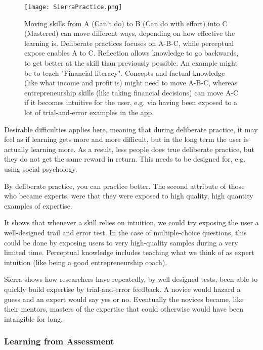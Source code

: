   \begin{figure}[h]
    \centering
    \texttt{[image: SierraPractice.png]}
    \caption{Moving skills from A (Can't do) to B (Can do with effort) into C (Mastered) can move different ways, depending on how effective the learning is. Deliberate practices focuses on A-B-C, while perceptual expose enables A to C. Reflection allows knowledge to go backwards, to get better at the skill than previously possible. An example might be to teach "Financial literacy". Concepts and factual knowledge (like what income and profit is) might need to move A-B-C, whereas entrepreneurship skills (like taking financial decisions) can move A-C if it becomes intuitive for the user, e.g. via having been exposed to a lot of trial-and-error examples in the app.}
    \label{fig:sierra-practice}
  \end{figure}

  Desirable difficulties applies here, meaning that during deliberate practice, it may feel as if learning gets more and more difficult, but in the long term the user is actually learning more. As a result, less people does true deliberate practice, but they do not get the same reward in return. This needs to be designed for, e.g. using social psychology.

  By deliberate practice, you can practice better. The second attribute of those who became experts, were that they were exposed to high quality, high quantity examples of expertise. \citep{sierra}

  It shows that whenever a skill relies on intuition, we could try exposing the user a well-designed trail and error test. In the case of multiple-choice questions, this could be done by exposing users to very high-quality samples during a very limited time. Perceptual knowledge includes teaching what we think of as expert intuition (like being a good entrepreneurship coach).

  Sierra shows how researchers have repeatedly, by well designed tests, been able to quickly build expertise by trial-and-error feedback. A novice would hazard a guess and an expert would say yes or no. Eventually the novices became, like their mentors, masters of the expertise that could otherwise would have been intangible for long.

  \subsubsection{Learning from Assessment}\label{learning-assessment}

